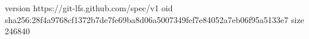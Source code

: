version https://git-lfs.github.com/spec/v1
oid sha256:28f4a9768cf1372b7de7fe69ba8d06a5007349fef7e84052a7eb06f95a5133e7
size 246840
